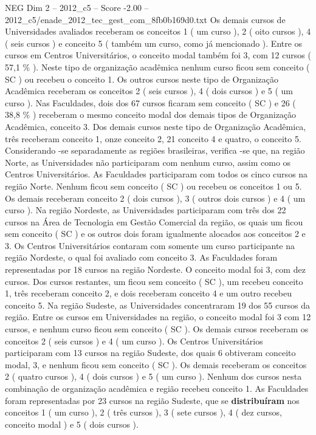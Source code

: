 \begin{textsample}{NEG Dim 2 – 2012\_c5 – Score -2.00 – 2012\_c5/enade\_2012\_tec\_gest\_com\_8fb0b169d0.txt}
Os demais cursos de Universidades avaliados receberam os conceitos 1 ( um curso ), 2 ( oito cursos ), 4 ( seis cursos ) e conceito 5 ( também um curso, como já mencionado ).
Entre os cursos em Centros Universitários, o conceito modal também foi 3, com 12 cursos ( 57,1 \% ).
Neste tipo de organização acadêmica nenhum curso ficou sem conceito ( SC ) ou recebeu o conceito 1.
Os outros cursos neste tipo de Organização Acadêmica receberam os conceitos 2 ( seis cursos ), 4 ( dois cursos ) e 5 ( um curso ).
Nas Faculdades, dois dos 67 cursos ficaram sem conceito ( SC ) e 26 ( 38,8 \% ) receberam o mesmo conceito modal dos demais tipos de Organização Acadêmica, conceito 3.
Dos demais cursos neste tipo de Organização Acadêmica, três receberam conceito 1, onze conceito 2, 21 conceito 4 e quatro, o conceito 5.
Considerando -se separadamente as regiões brasileiras, verifica -se que, na região Norte, as Universidades não participaram com nenhum curso, assim como os Centros Universitários.
As Faculdades participaram com todos os cinco cursos na região Norte.
Nenhum ficou sem conceito ( SC ) ou recebeu os conceitos 1 ou 5.
Os demais receberam conceito 2 ( dois cursos ), 3 ( outros dois cursos ) e 4 ( um curso ).
Na região Nordeste, as Universidades participaram com três dos 22 cursos na Área de Tecnologia em Gestão Comercial da região, os quais um ficou sem conceito ( SC ) e os outros dois foram igualmente alocados aos conceitos 2 e 3.
Os Centros Universitários contaram com somente um curso participante na região Nordeste, o qual foi avaliado com conceito 3.
As Faculdades foram representadas por 18 cursos na região Nordeste.
O conceito modal foi 3, com dez cursos.
Dos cursos restantes, um ficou sem conceito ( SC ), um recebeu conceito 1, três receberam conceito 2, e dois receberam conceito 4 e um outro recebeu conceito 5.
Na região Sudeste, as Universidades concentraram 19 dos 55 cursos da região.
Entre os cursos em Universidades na região, o conceito modal foi 3 com 12 cursos, e nenhum curso ficou sem conceito ( SC ).
Os demais cursos receberam os conceitos 2 ( seis cursos ) e 4 ( um curso ).
Os Centros Universitários participaram com 13 cursos na região Sudeste, dos quais 6 obtiveram conceito modal, 3, e nenhum ficou sem conceito ( SC ).
Os demais receberam os conceitos 2 ( quatro cursos ), 4 ( dois cursos ) e 5 ( um curso ).
Nenhum dos cursos nesta combinação de organização acadêmica e região recebeu conceito 1.
As Faculdades foram representadas por 23 cursos na região Sudeste, que se \textbf{distribuíram} nos conceitos 1 ( um curso ), 2 ( três cursos ), 3 ( sete cursos ), 4 ( dez cursos, conceito modal ) e 5 ( dois cursos ).

\end{textsample}
